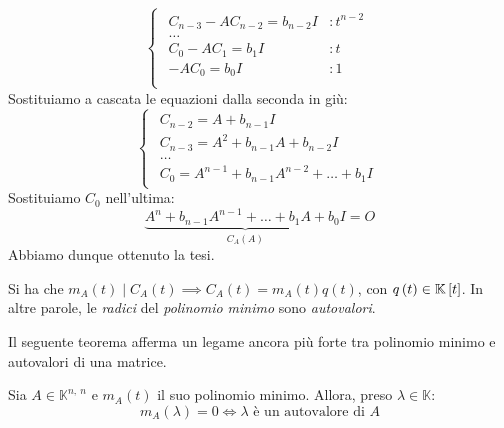 \begin{demonstration}
\begin{equation*}
\begin{cases}
\begin{array}{ll}
			C_{n-3}-AC_{n-2}=b_{n-2}I&\colon t^{n-2}\\
			\ldots&\\
			C_{0}-AC_{1}=b_{1}I&\colon t\\
			-AC_0=b_0I&\colon 1\\
		\end{array}
	\end{cases}
\end{equation*}
Sostituiamo a cascata le equazioni dalla seconda in giù:
\begin{equation*}
	\begin{cases}
		\begin{array}{ll}
			C_{n-2}=A+b_{n-1}I\\
			C_{n-3}=A^2+b_{n-1}A+b_{n-2}I\\
			\ldots\\
			C_0=A^{n-1}+b_{n-1}A^{n-2}+\ldots+b_1I
		\end{array}
	\end{cases}
\end{equation*}
Sostituiamo $C_0$ nell'ultima:
\begin{equation*}
	\underbrace{A^n+b_{n-1}A^{n-1}+\ldots+b_1A+b_0I}_{C_A\left(A\right)}=O
\end{equation*}
Abbiamo dunque ottenuto la tesi.
\end{demonstration}
\begin{observe}
	Si ha che $m_A\left(t\right)\mid C_A\left(t\right)\implies C_A\left(t\right)=m_A\left(t\right)q\left(t\right)$, con $q\left(t\right)\in\mathbb{K}\left[t\right]$. In altre parole, le \textit{radici} del \textit{polinomio minimo} sono \textit{autovalori}.
\end{observe}
Il seguente teorema afferma un legame ancora più forte tra polinomio minimo e autovalori di una matrice.
\begin{theorema}
	Sia $A\in \mathbb{K}^{n,\ n}$ e $m_A\left(t\right)$ il suo polinomio minimo. Allora, preso $\lambda\in\mathbb{K}$:
	\begin{equation}
		m_A\left(\lambda\right)=0\iff \lambda\text{ è un autovalore di }A
	\end{equation}
\vspace{-6mm}
\end{theorema}
